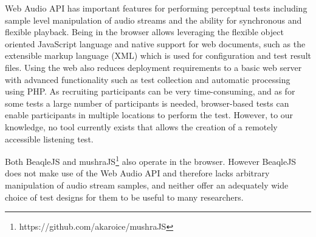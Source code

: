 \documentclass{sig-alternate}
\begin{document}
	Web Audio API has important features for performing perceptual tests including sample level manipulation of audio streams \cite{schoeffler2015mushra} and the ability for synchronous and flexible playback. Being in the browser allows leveraging the flexible object oriented JavaScript language and native support for web documents, such as the extensible markup language (XML) which is used for configuration and test result files. Using the web also reduces deployment requirements to a basic web server with advanced functionality such as test collection and automatic processing using PHP. As recruiting participants can be very time-consuming, and as for some tests a large number of participants is needed, browser-based tests \cite{schoeffler2015mushra} can enable participants in multiple locations to perform the test. However, to our knowledge, no tool currently exists that allows the creation of a remotely accessible listening test. 

	Both BeaqleJS \cite{beaqlejs} and mushraJS\footnote{https://github.com/akaroice/mushraJS} also operate in the browser. However BeaqleJS does not make use of the Web Audio API and therefore lacks arbitrary manipulation of audio stream samples, and neither offer an adequately wide choice of test designs for them to be useful to many researchers. %
	
\end{document}
